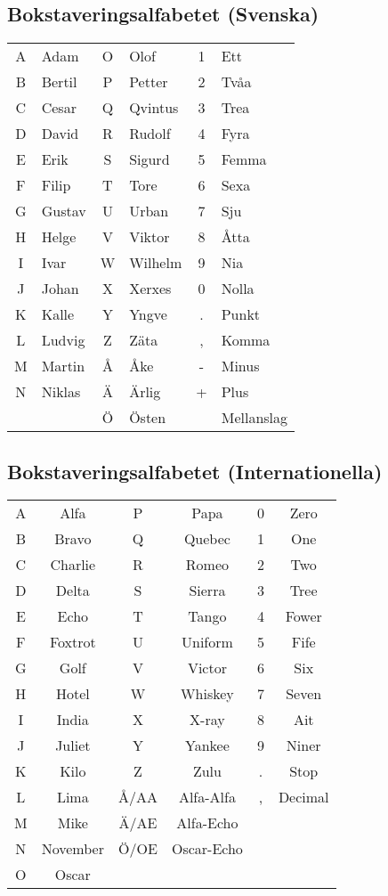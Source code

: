 \documentclass[10pt,swedish,a4paper]{article}
\begin{document}
\clearpage
\subsection{Bokstaveringsalfabetet (Svenska)}

\begin{longtable}{cl|cl|cl }
	A & Adam   & O & Olof    & 1 & Ett \\
	B & Bertil & P & Petter  & 2 & Tvåa \\
	C & Cesar  & Q & Qvintus & 3 & Trea \\
	D & David  & R & Rudolf  & 4 & Fyra \\
	E & Erik   & S & Sigurd  & 5 & Femma \\
	F & Filip  & T & Tore    & 6 & Sexa \\
	G & Gustav & U & Urban   & 7 & Sju \\
	H & Helge  & V & Viktor  & 8 & Åtta \\
	I & Ivar   & W & Wilhelm & 9 & Nia \\
	J & Johan  & X & Xerxes  & 0 & Nolla \\
	K & Kalle  & Y & Yngve   & . & Punkt\\
	L & Ludvig & Z & Zäta    & , & Komma\\
	M & Martin & Å & Åke     & - & Minus\\
	N & Niklas & Ä & Ärlig   & + & Plus\\
	  &        & Ö & Östen   &   & Mellanslag\\
\end{longtable}

\subsection{Bokstaveringsalfabetet (Internationella)}
\begin{longtable}{cc|cc|cc}
	A &   Alfa   &  P   &    Papa    & 0 &  Zero   \\
	B &  Bravo   &  Q   &   Quebec   & 1 &   One   \\
	C & Charlie  &  R   &   Romeo    & 2 &   Two   \\
	D &  Delta   &  S   &   Sierra   & 3 &  Tree   \\
	E &   Echo   &  T   &   Tango    & 4 &  Fower  \\
	F & Foxtrot  &  U   &  Uniform   & 5 &  Fife   \\
	G &   Golf   &  V   &   Victor   & 6 &   Six   \\
	H &  Hotel   &  W   &  Whiskey   & 7 &  Seven  \\
	I &  India   &  X   &   X-ray    & 8 &   Ait   \\
	J &  Juliet  &  Y   &   Yankee   & 9 &  Niner  \\
	K &   Kilo   &  Z   &    Zulu    & . &  Stop   \\
	L &   Lima   & Å/AA & Alfa-Alfa  & , & Decimal \\
	M &   Mike   & Ä/AE & Alfa-Echo  &  \\
	N & November & Ö/OE & Oscar-Echo &  \\
	O &  Oscar   &      &            &
\end{longtable}
\end{document}
